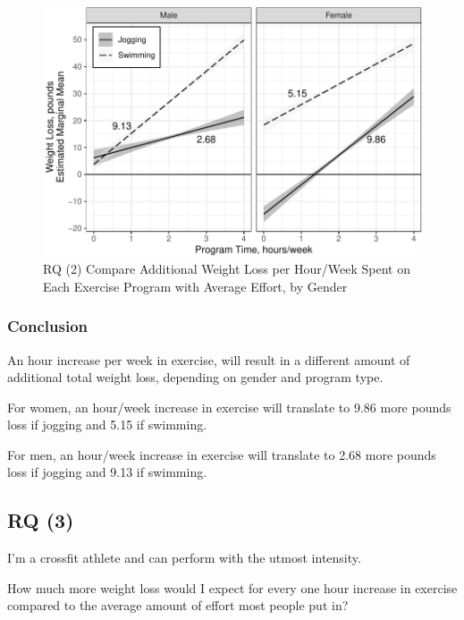 \documentclass[
]{article}
\begin{document}
\begin{figure}[hb]

\includegraphics{Appendix_ex_weightloss_files/figure-latex/unnamed-chunk-92-1} \hfill{}

\caption{RQ (2) Compare Additional Weight Loss per Hour/Week Spent on Each Exercise Program with Average Effort, by Gender}\label{fig:unnamed-chunk-92}
\end{figure}

\clearpage

\hypertarget{conclusion-1}{%
\subsubsection{Conclusion}\label{conclusion-1}}

An hour increase per week in exercise, will result in a different amount
of additional total weight loss, depending on gender and program type.

For women, an hour/week increase in exercise will translate to 9.86 more
pounds loss if jogging and 5.15 if swimming.

For men, an hour/week increase in exercise will translate to 2.68 more
pounds loss if jogging and 9.13 if swimming.

\clearpage

\hypertarget{rq-3-1}{%
\subsection{RQ (3)}\label{rq-3-1}}

I'm a crossfit athlete and can perform with the utmost intensity.

How much more weight loss would I expect for every one hour increase in
exercise compared to the average amount of effort most people put in?
\end{document}
